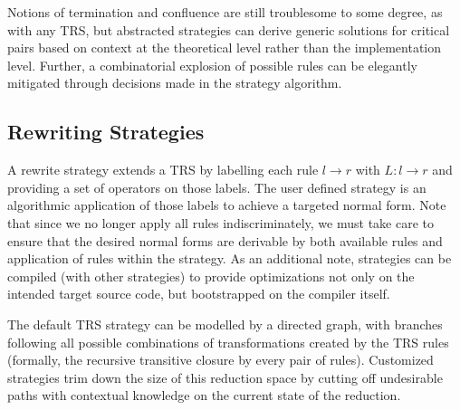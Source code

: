 \documentclass{article}
\begin{document}
Notions of termination and confluence are still troublesome to some degree, as with any TRS, but abstracted strategies can derive
generic solutions for critical pairs based on context at the theoretical level rather than the implementation level.
Further, a combinatorial explosion of possible rules can be elegantly mitigated through decisions made in the strategy algorithm.


\subsection{Rewriting Strategies}

A rewrite strategy extends a TRS by labelling each rule $l \rightarrow r$ with $L: l \rightarrow r$ and providing a set of operators on those labels.
The user defined strategy is an algorithmic application of those labels to achieve a targeted normal form. Note that since we no longer apply
all rules indiscriminately, we must take care to ensure that the desired normal forms are derivable by both available rules and application of rules within the strategy.
As an additional note, strategies can be compiled (with other strategies) to provide optimizations not only on the intended target source code,
but bootstrapped on the compiler itself.

The default TRS strategy can be modelled by a directed graph, with branches following all possible combinations of transformations created by the TRS rules
(formally, the recursive transitive closure by every pair of rules). Customized strategies trim down the size of this reduction space by cutting off undesirable paths
with contextual knowledge on the current state of the reduction.
\end{document}
